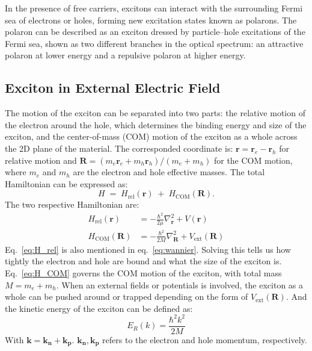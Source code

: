 In the presence of free carriers, excitons can interact with the surrounding Fermi sea of electrons or holes, forming new excitation states known as polarons\cite{Sidler2017-ff}. 
The polaron can be described as an exciton dressed by particle--hole excitations of the Fermi sea, shown as two different branches in the optical spectrum: an attractive polaron at lower energy and a repulsive polaron at higher energy\cite{Sidler2017-ff,Liu2021-er}.

\subsection{Exciton in External Electric Field}
The motion of the exciton can be separated into two parts: the relative motion of the electron around the hole, which determines the binding energy and size of the exciton, and the center-of-mass (COM) motion of the exciton as a whole across the 2D plane of the material\cite{Yu2010-yp,Griffiths2019-oc}.
The corresponded coordinate is:
$\mathbf r = \mathbf r_e - \mathbf r_h$ for relative motion
and
$\mathbf R = (m_e \mathbf r_e + m_h \mathbf r_h)/(m_e+m_h)$ for the COM motion, where $m_e$ and $m_h$ are the electron and hole effective masses.
The total Hamiltonian can be expressed as:
\begin{equation}
H \;=\; H_{\mathrm{rel}}(\mathbf r) \;+\; H_{\mathrm{COM}}(\mathbf R).
\label{eq:exciton_split}
\end{equation}
The two respective Hamiltonian are:
\begin{align}
H_{\mathrm{rel}}(\mathbf r) &= -\frac{\hbar^2}{2\mu}\nabla_{\mathbf r}^2 
+ V(\mathbf r) \label{eq:H_rel}\\[6pt]
H_{\mathrm{COM}}(\mathbf R) &= -\frac{\hbar^2}{2M}\nabla_{\mathbf R}^2 
+ V_{\mathrm{ext}}(\mathbf R) \label{eq:H_COM}
\end{align}
Eq.~\ref{eq:H_rel} is also mentioned in eq.~\ref{eq:wannier}.
Solving this tells us how tightly the electron and hole are bound and what the size of the exciton is. 
Eq.~\ref{eq:H_COM} governs the COM motion of the exciton, with total mass $M = m_e + m_h$. 
When an external fields or potentials is involved, the exciton as a whole can be pushed around or trapped depending on the form of $V_{\mathrm{ext}}(\mathbf R)$. 
And the kinetic energy of the exciton can be defined as\cite{Yu2010-ae}:
\begin{equation}
E_{R}(k) = \frac{\hbar^{2}k^{2}}{2M}
\label{eq:exciton_Ek}
\end{equation}
With $\mathbf{k = k_n+k_p}$. $\mathbf{k_n}, \mathbf{k_p}$ refers to the electron and hole momentum, respectively.

